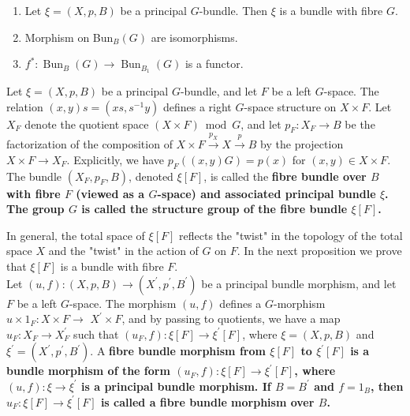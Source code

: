 \begin{prop}
    \begin{enumerate}
        \item Let $\xi=(X, p, B)$ be a principal $G$-bundle. Then $\xi$ is a bundle with fibre $G$.
        \item Morphism on Bun$_B(G)$ are isomorphisms.
        \item $f^*: \operatorname{Bun}_B(G) \rightarrow \operatorname{Bun}_{B_1}(G)$ is a functor.
    \end{enumerate}

\end{prop}

Let $\xi=(X, p, B)$ be a principal $G$-bundle, and let $F$ be a left $G$-space. The relation $(x, y) s=\left(x s, s^{-1} y\right)$ defines a right $G$-space structure on $X \times F$. Let $X_F$ denote the quotient space $(X \times F) \bmod G$, and let $p_F: X_F \rightarrow B$ be the factorization of the composition of $X \times F \xrightarrow{p_X} X \xrightarrow{p} B$ by the projection $X \times F \rightarrow X_F$. Explicitly, we have $p_F((x, y) G)=p(x)$ for $(x, y) \in X \times F$.\\
The bundle $\left(X_F, p_F, B\right)$, denoted $\xi[F]$, is called the \bf{fibre bundle over $B$ with fibre $F$} (viewed as a $G$-space) and \bf{associated principal bundle $\xi$}. The group $G$ is called the \bf{structure group} of the fibre bundle $\xi[F]$.

In general, the total space of $\xi[F]$ reflects the "twist" in the topology of the total space $X$ and the "twist" in the action of $G$ on $F$. In the next proposition we prove that $\xi[F]$ is a bundle with fibre $F$.\\

Let $(u, f):(X, p, B) \rightarrow\left(X^{\prime}, p^{\prime}, B^{\prime}\right)$ be a principal bundle morphism, and let $F$ be a left $G$-space. The morphism $(u, f)$ defines a $G$-morphism $u \times 1_F: X \times F \rightarrow$ $X^{\prime} \times F$, and by passing to quotients, we have a map $u_F: X_F \rightarrow X_F^{\prime}$ such that $\left(u_F, f\right): \xi[F] \rightarrow \xi^{\prime}[F]$, where $\xi=(X, p, B)$ and $\xi^{\prime}=\left(X^{\prime}, p^{\prime}, B^{\prime}\right)$.
A \bf{fibre bundle morphism} from $\xi[F]$ to $\xi^{\prime}[F]$ is a bundle morphism of the form $\left(u_F, f\right): \xi[F] \rightarrow \xi^{\prime}[F]$, where $(u, f): \xi \rightarrow \xi^{\prime}$ is a principal bundle morphism. If $B=B^{\prime}$ and $f=1_B$, then $u_F: \xi[F] \rightarrow \xi^{\prime}[F]$ is called a fibre bundle morphism over $B$.\\


